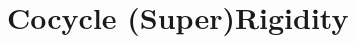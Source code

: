 \documentclass[../main.tex]{subfiles}
\begin{document}
\section{Cocycle (Super)Rigidity}
\end{document}
